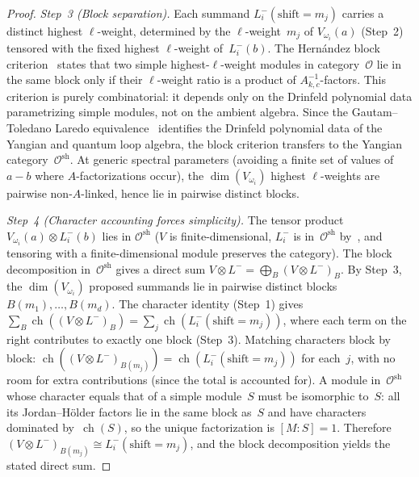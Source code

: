 \begin{proof}
\emph{Step~3 (Block separation).}
Each summand $L^-_i(\mathrm{shift} = m_j)$ carries a distinct
highest $\ell$-weight, determined by the $\ell$-weight~$m_j$ of
$V_{\omega_i}(a)$ (Step~2) tensored with the fixed highest
$\ell$-weight of~$L^-_i(b)$. The Hern\'andez block
criterion~\cite{Hernandez05, HJZ25} states that two simple
highest-$\ell$-weight modules in category~$\mathcal{O}$ lie in
the same block only if their $\ell$-weight ratio is a product of
$A_{k,c}^{-1}$-factors. This criterion is purely combinatorial:
it depends only on the Drinfeld polynomial data parametrizing
simple modules, not on the ambient algebra. Since the
Gautam--Toledano Laredo equivalence~\cite{GTL17} identifies the
Drinfeld polynomial data of the Yangian and quantum loop algebra,
the block criterion transfers to the Yangian
category~$\mathcal{O}^{\mathrm{sh}}$.
At generic spectral parameters
\textup{(}avoiding a finite set of values of~$a - b$ where
$A$-factorizations occur\textup{)}, the $\dim(V_{\omega_i})$
highest $\ell$-weights are pairwise non-$A$-linked, hence lie in
pairwise distinct blocks.

\emph{Step~4 (Character accounting forces simplicity).}
The tensor product $V_{\omega_i}(a) \otimes L^-_i(b)$ lies in
$\mathcal{O}^{\mathrm{sh}}$
\textup{(}$V$ is finite-dimensional, $L^-_i$ is
in~$\mathcal{O}^{\mathrm{sh}}$ by~\cite{HJZ25}, and
tensoring with a finite-dimensional module preserves the
category\textup{)}. The block decomposition
in~$\mathcal{O}^{\mathrm{sh}}$ gives a direct sum
$V \otimes L^- = \bigoplus_B (V \otimes L^-)_B$.
By Step~3, the $\dim(V_{\omega_i})$ proposed summands lie in
pairwise distinct blocks $B(m_1), \dotsc, B(m_d)$.
The character identity (Step~1) gives
$\sum_B \operatorname{ch}((V \otimes L^-)_B)
= \sum_j \operatorname{ch}(L^-_i(\mathrm{shift} = m_j))$,
where each term on the right contributes to exactly one block
(Step~3). Matching characters block by block:
$\operatorname{ch}((V \otimes L^-)_{B(m_j)})
= \operatorname{ch}(L^-_i(\mathrm{shift} = m_j))$
for each~$j$, with no room for extra contributions
\textup{(}since the total is accounted for\textup{)}.
A module in~$\mathcal{O}^{\mathrm{sh}}$ whose character
equals that of a simple module~$S$ must be isomorphic to~$S$:
all its Jordan--H\"older factors lie in the same block as~$S$
and have characters dominated by~$\operatorname{ch}(S)$, so the
unique factorization is $[M:S] = 1$. Therefore
$(V \otimes L^-)_{B(m_j)} \cong L^-_i(\mathrm{shift} = m_j)$,
and the block decomposition yields the stated direct sum.
\end{proof}

